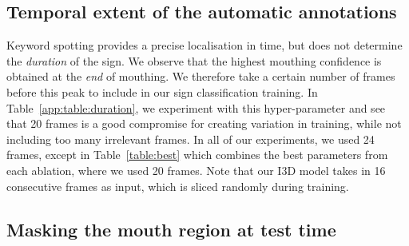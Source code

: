 \subsection{Temporal extent of the automatic annotations} \label{app:subsec:numframes}
Keyword spotting provides a precise localisation in time,
but does not determine the \textit{duration} of the sign. We observe
that the highest mouthing confidence is obtained at the \textit{end}
of mouthing. We therefore take a certain number of frames before
this peak to include in our sign classification training.
In Table~\ref{app:table:duration}, we experiment with this hyper-parameter and see that
20 frames is a good compromise for creating variation in training,
while not including too many irrelevant frames. In all of our
experiments, we used 24 frames, except in
Table~\ref{table:best}
which combines the best parameters from each ablation,
where we used 20 frames.
Note that our I3D
model takes in 16 consecutive frames as input, which is sliced
randomly during training.
\begin{table}[t]
    \centering
    \caption{The effect of the number of frames before the mouthing peak used for training.
        Networks are trained on \datasetName{}$_{m.8}$ with Kinetics initialisation.}
    \label{app:table:duration}
\end{table}


\subsection{Masking the mouth region at test time} \label{app:subsec:mouthmask}

